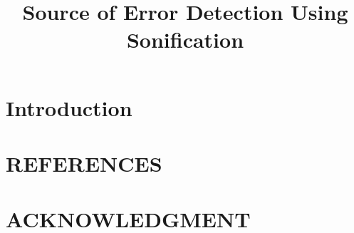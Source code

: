 \documentclass[a4paper,10pt,oneside]{article}
\title{Source of Error Detection Using Sonification}
\begin{document}
\ninept
\maketitle

\begin{sloppy}

\begin{abstract}

\end{abstract}

\section{Introduction}
\label{sec:intro}


\section{REFERENCES}
\label{sec:ref}


\section{ACKNOWLEDGMENT}
\label{sec:ack}




%
% 
%
% 

\end{sloppy}
\end{document}

